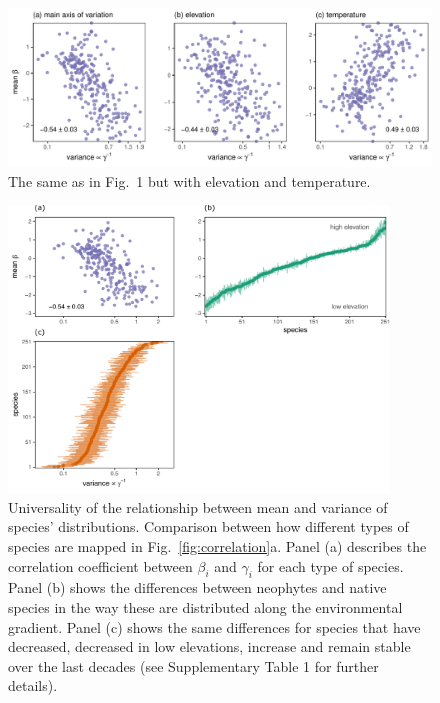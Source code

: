 \documentclass[11pt, a4paper]{article}
\begin{document}
\clearpage

\begin{figure}[ht]
  \centering
    \vspace{0.5cm}
    \includegraphics[width=1\textwidth]{figures/pca-elevation-temperature}
    	  \vspace{0.3cm}
	   \caption{The same as in Fig.~1 but with elevation and temperature.}
      \label{sfig:temperature-elevation}
\end{figure}

\clearpage

\begin{figure}[h]
  \centering
    \includegraphics[width=0.9\textwidth]{figures/categorical-figure1}
    	  \vspace{0.1cm}
	   \caption{Universality of the relationship between mean and variance of species' distributions. Comparison between how different types of species are mapped in Fig.~\ref{fig:correlation}a. Panel (a) describes the correlation coefficient between $\beta_i$ and $\gamma_i$ for each type of species. Panel (b) shows the differences between neophytes and native species in the way these are distributed along the environmental gradient. Panel (c) shows the same differences for species that have decreased, decreased in low elevations, increase and remain stable over the last decades (see Supplementary Table 1 for further details).}
      \label{sfig:categorical-baseline}
\end{figure}
\end{document}
